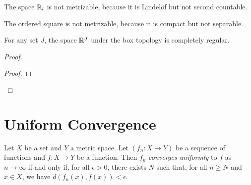 \begin{example}
    The space $\mathbb{R}_l$ is not metrizable, because it is Lindel\"{o}f but not
    second countable.
\end{example}

\begin{example}
    The ordered square is not metrizable, because it is compact but not separable.
\end{example}

\begin{proposition}
    For any set $J$, the space $\mathbb{R}^J$ under the box topology is completely regular.
\end{proposition}

\begin{proof}
    \pf
    \begin{proof}
    \end{proof}
\end{proof}

\section{Uniform Convergence}

\begin{definition}
    Let $X$ be a set and $Y$ a metric space. Let $(f_n : X \rightarrow Y)$ be a sequence of functions and $f : X \rightarrow Y$ be a function.
    Then $f_n$ \emph{converges uniformly} to $f$ as $n \rightarrow \infty$ if and only if, for all $\epsilon > 0$, there exists $N$ such that, for all $n \geq N$ and $x \in X$,
    we have $d(f_n(x),f(x)) < \epsilon$.
\end{definition}

